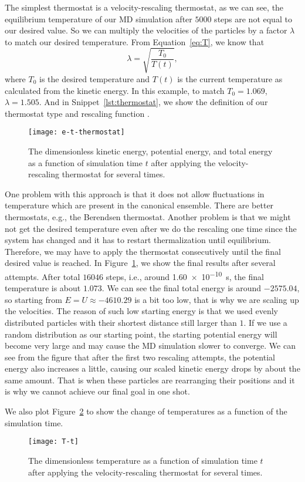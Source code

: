 The simplest thermostat is a velocity-rescaling thermostat, as we can see, the equilibrium
temperature of our MD simulation after \(5000\) steps are not equal to our desired value.
So we can multiply the velocities of the particles by a factor \(\lambda\) to match our
desired temperature.
From Equation~\ref{eq:T}, we know that
%
\begin{equation}
    \lambda = \sqrt{\frac{ T_0 }{ T(t) }},
\end{equation}
%
where \(T_0\) is the desired temperature and \(T(t)\) is the current temperature as
calculated from the kinetic energy.
In this example, to match \(T_0 = 1.069\), \(\lambda = 1.505\).
And in Snippet~\ref{lst:thermostat}, we show the definition of our thermostat type
 and rescaling function .

\begin{figure}[H]
    \centering
    \texttt{[image: e-t-thermostat]}
    \caption{The dimensionless kinetic energy, potential energy, and total energy
        as a function of simulation time \(t\) after applying the velocity-rescaling
        thermostat for several times.}
    \label{fig:md-thermostat}
\end{figure}

One problem with this approach is that it does not
allow fluctuations in temperature which are present in the canonical ensemble.
There are better thermostats, e.g., the Berendsen thermostat.
Another problem is that we might not get the desired temperature even after we do the
rescaling one time since the system has changed and it has to restart thermalization
until equilibrium. Therefore, we may have to apply the thermostat consecutively
until the final desired value is reached.
In Figure~\ref{fig:md-thermostat}, we show the final results after several attempts.
After total \(16046\) steps, i.e., around \qty{1.60e-10}{\second}, the final temperature is
about \(1.073\).
We can see the final total energy is around \(-2575.04\), so starting from
\(E = U \approx -4610.29\) is a bit too low, that is why we are scaling up the velocities.
The reason of such low starting energy is that we used evenly distributed particles
with their shortest distance still larger than \(1\). If we use a random distribution
as our starting point, the starting potential energy will become very large and
may cause the MD simulation slower to converge.
We can see from the figure that after the first two rescaling attempts, the potential
energy also increases a little, causing our scaled kinetic energy drops by about the
same amount. That is when these particles are rearranging their positions and
it is why we cannot achieve our final goal in one shot.

We also plot Figure~\ref{fig:T-t} to show the change of temperatures as a function
of the simulation time.

\begin{figure}
    \centering
    \texttt{[image: T-t]}
    \caption{The dimensionless temperature as a function of simulation time \(t\) after
        applying the velocity-rescaling thermostat for several times.}
    \label{fig:T-t}
\end{figure}
